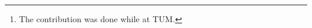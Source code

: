 \def\paperTitle{On Neural BRDFs: A Thorough Comparison of State-of-the-Art Approaches}

\makeatletter
\renewcommand*{\@fnsymbol}[1]{$\dag$}

\author{Florian Hofherr$^{1,2}$
\qquad
Bjoern Haefner\thanks{The contribution was done while at TUM.}~$^{~1, 2, 3}$
\qquad
Daniel Cremers$^{1,2}$\\[2pt]
{\small$^1$Technical University of Munich \qquad $^2$Munich Center for Machine Learning \qquad $^3$NVIDIA }
\vspace{1em}
}


\def\wacvPaperID{685} %
\def\confName{WACV}
\def\confYear{2025}